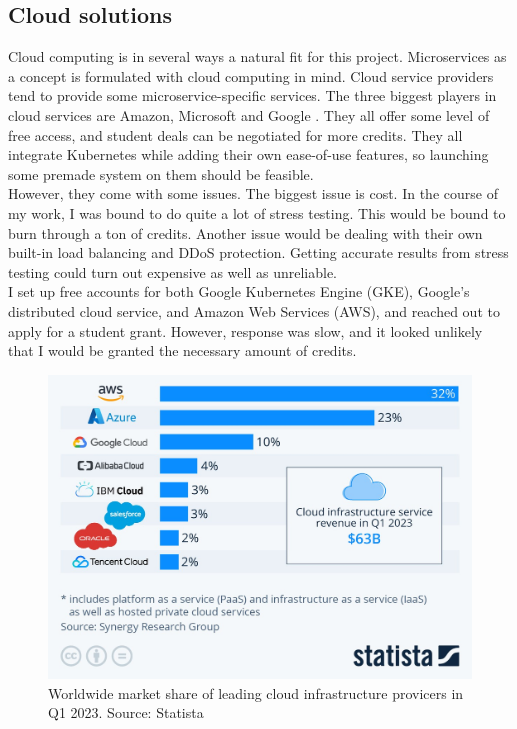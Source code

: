 \subsection{Cloud solutions}
Cloud computing is in several ways a natural fit for this project. Microservices as a concept is formulated with cloud computing in mind. Cloud service providers tend to provide some microservice-specific services. 
The three biggest players in cloud services are Amazon, Microsoft and Google \cite*{DgtlInfra}. They all offer some level of free access, and student deals can be negotiated for more credits. They all integrate Kubernetes while adding their own ease-of-use features, so launching some premade system on them should be feasible. \\
However, they come with some issues. The biggest issue is cost. In the course of my work, I was bound to do quite a lot of stress testing. This would be bound to burn through a ton of credits. Another issue would be dealing with their own built-in load balancing and DDoS protection. Getting accurate results from stress testing could turn out expensive as well as unreliable.\\
I set up free accounts for both Google Kubernetes Engine (GKE), Google's distributed cloud service, and Amazon Web Services (AWS), and reached out to apply for a student grant. However, response was slow, and it looked unlikely that I would be granted the necessary amount of credits.

\begin{figure} 
\centering 
\includegraphics[width=\columnwidth]{Figures/Graphs/Cloud_market_share.jpeg}
\caption{Worldwide market share of leading cloud infrastructure provicers in Q1 2023. Source: Statista}
\label{Cloud market share}
\end{figure}

